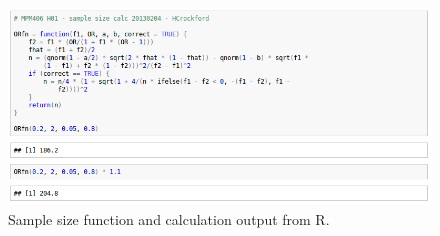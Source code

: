 \documentclass[11pt,twocolumn]{article}
\begin{document}
\begin{figure}[h!]
	\centering
	\includegraphics[scale=0.5]{samplesizecalc.jpg}
	\caption{Sample size function and calculation output from R.}
	\label{fig:samplesizecalc}
\end{figure}

\clearpage


\end{document}
